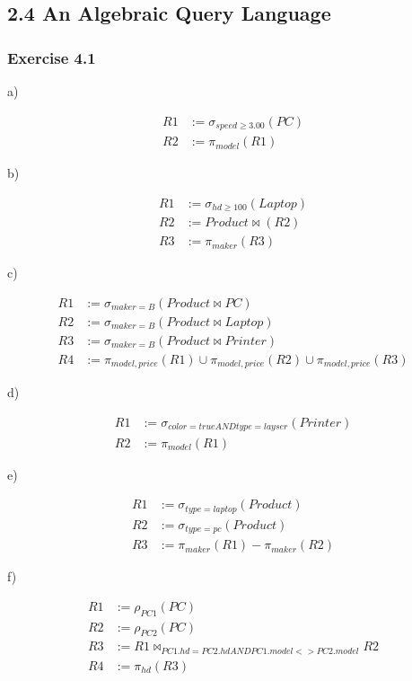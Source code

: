 \subsection*{2.4 An Algebraic Query Language}

\subsubsection*{Exercise 4.1}

a)

\begin{align*}
  R1 &:= \sigma_{speed \geq 3.00}(PC) \\
  R2 &:= \pi_{model}(R1)
\end{align*}

b)

\begin{align*}
  R1 &:= \sigma_{hd \geq 100}(Laptop) \\
  R2 &:= Product \bowtie (R2) \\
  R3 &:= \pi_{maker}(R3)
\end{align*}

c)

\begin{align*}
  R1 &:= \sigma_{maker=B}(Product \bowtie PC) \\
  R2 &:= \sigma_{maker=B}(Product \bowtie Laptop) \\
  R3 &:= \sigma_{maker=B}(Product \bowtie Printer) \\
  R4 &:= \pi_{model, price}(R1) \cup \pi_{model, price}(R2)
         \cup \pi_{model, price}(R3)
\end{align*}

d)

\begin{align*}
  R1 &:= \sigma_{color=true AND type=layser}(Printer) \\
  R2 &:= \pi_{model}(R1)
\end{align*}

e)

\begin{align*}
  R1 &:= \sigma_{type=laptop}(Product) \\
  R2 &:= \sigma_{type=pc}(Product) \\
  R3 &:= \pi_{maker}(R1) - \pi_{maker}(R2)
\end{align*}

f)

\begin{align*}
  R1 &:= \rho_{PC1}(PC) \\
  R2 &:= \rho_{PC2}(PC) \\
  R3 &:= R1 \bowtie_{PC1.hd = PC2.hd AND PC1.model <> PC2.model} R2 \\
  R4 &:= \pi_{hd}(R3)
\end{align*}

